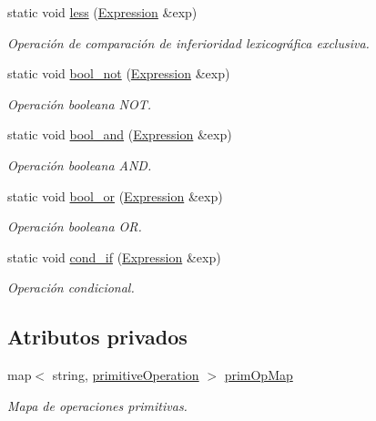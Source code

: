 \begin{DoxyCompactItemize}
static void \hyperlink{class_primitive_operation_space_a9d51e981582021bbd71117122225029a}{less} (\hyperlink{class_expression}{Expression} \&exp)
\begin{DoxyCompactList}\small\item\em Operación de comparación de inferioridad lexicográfica exclusiva. \end{DoxyCompactList}\item 
static void \hyperlink{class_primitive_operation_space_a32f569400e43c1f58c53c5a0a28eec9c}{bool\+\_\+not} (\hyperlink{class_expression}{Expression} \&exp)
\begin{DoxyCompactList}\small\item\em Operación booleana N\+OT. \end{DoxyCompactList}\item 
static void \hyperlink{class_primitive_operation_space_a7e9db24a025849ea4236bc5a6ef400f9}{bool\+\_\+and} (\hyperlink{class_expression}{Expression} \&exp)
\begin{DoxyCompactList}\small\item\em Operación booleana A\+ND. \end{DoxyCompactList}\item 
static void \hyperlink{class_primitive_operation_space_a3456bcd89f280503905fa73ba995a898}{bool\+\_\+or} (\hyperlink{class_expression}{Expression} \&exp)
\begin{DoxyCompactList}\small\item\em Operación booleana OR. \end{DoxyCompactList}\item 
static void \hyperlink{class_primitive_operation_space_afa919abace8bbc798f45c539cd479c18}{cond\+\_\+if} (\hyperlink{class_expression}{Expression} \&exp)
\begin{DoxyCompactList}\small\item\em Operación condicional. \end{DoxyCompactList}\end{DoxyCompactItemize}
\subsection*{Atributos privados}
\begin{DoxyCompactItemize}
\item 
map$<$ string, \hyperlink{class_primitive_operation_space_a09c5a4b643964f8e61f797460dc6e765}{primitive\+Operation} $>$ \hyperlink{class_primitive_operation_space_afd359615001ed1e9b44b9618287834ec}{prim\+Op\+Map}
\begin{DoxyCompactList}\small\item\em Mapa de operaciones primitivas. \end{DoxyCompactList}\end{DoxyCompactItemize}


